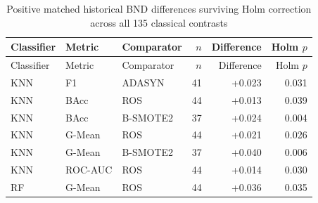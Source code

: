 \begingroup\small\setlength{\tabcolsep}{3pt}
\begin{longtable}{@{}lllrrr@{}}
\caption{Positive matched historical BND differences surviving Holm correction across all 135 classical contrasts}\label{tab:6}\\
\toprule
Classifier & Metric & Comparator & $n$ & Difference & Holm $p$ \\
\midrule
\endfirsthead
\toprule
Classifier & Metric & Comparator & $n$ & Difference & Holm $p$ \\
\midrule
\endhead
\bottomrule
\endlastfoot
KNN & F1 & ADASYN & 41 & +0.023 & 0.031 \\
KNN & BAcc & ROS & 44 & +0.013 & 0.039 \\
KNN & BAcc & B-SMOTE2 & 37 & +0.024 & 0.004 \\
KNN & G-Mean & ROS & 44 & +0.021 & 0.026 \\
KNN & G-Mean & B-SMOTE2 & 37 & +0.040 & 0.006 \\
KNN & ROC-AUC & ROS & 44 & +0.014 & 0.030 \\
RF & G-Mean & ROS & 44 & +0.036 & 0.035 \\
\end{longtable}
\endgroup
